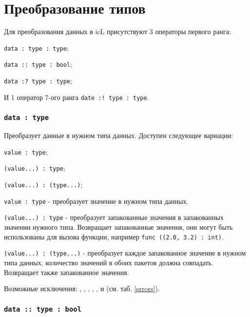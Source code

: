 \section{Преобразование типов}

Для преобразования данных в icL присутствуют 3 операторы первого ранга:
\begin{icItems}
	\item \lstinline|data : type : type|;
	\item \lstinline|data :: type : bool|;
	\item \lstinline|data :? type : type|;
\end{icItems}

И 1 оператор 7-ого ранга \lstinline|date :! type : type|.

\subsubsection{\lstinline|data : type|}

Преобразует данные в нужном типа данных. Доступен следующее вариации:
\begin{icItems}
	\item \lstinline|value : type|;
	\item \lstinline|(value...) : type|;
	\item \lstinline|(value...) : (type...)|;
\end{icItems}

\lstinline|value : type| - преобразует значение в нужном типа данных.

\lstinline|(value...) : type| - преобразует запакованные значения в запакованных значении нужного типа. Возвращает запакованные значения, они могут быть использованы для вызова функции, например \lstinline|func ((2.0, 3.2) : int)|.

\lstinline|(value...) : (type...)| - преобразует каждое запакованное значение в нужном типа данных, количество значений в обоих пакетов должна совпадать. Возвращает также запакованное значения.

Возможные исключения: , , , , ,  и  (см. таб. \ref{errors}).

\subsubsection{\lstinline|data :: type : bool|}

